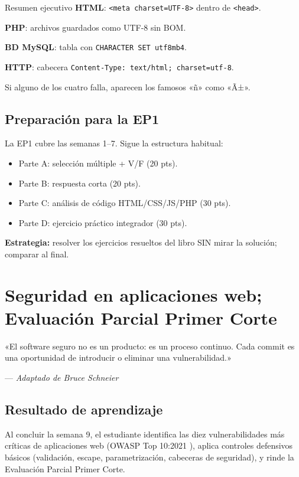 \documentclass[11pt,a4paper,openany]{book}
\begin{document}
\begin{cajadefinicion}{Resumen ejecutivo}
\textbf{HTML}: \texttt{<meta charset=UTF-8>} dentro de
\texttt{<head>}.

\textbf{PHP}: archivos guardados como UTF-8 sin BOM.

\textbf{BD MySQL}: tabla con \texttt{CHARACTER SET utf8mb4}.

\textbf{HTTP}: cabecera
\texttt{Content-Type: text/html; charset=utf-8}.

Si alguno de los cuatro falla, aparecen los famosos «ñ» como «Ã±».
\end{cajadefinicion}

\section{Preparación para la EP1}

La EP1 cubre las semanas 1--7. Sigue la estructura habitual:
\begin{itemize}
\item Parte A: selección múltiple + V/F (20 pts).
\item Parte B: respuesta corta (20 pts).
\item Parte C: análisis de código HTML/CSS/JS/PHP (30 pts).
\item Parte D: ejercicio práctico integrador (30 pts).
\end{itemize}

\textbf{Estrategia:} resolver los ejercicios resueltos del libro
SIN mirar la solución; comparar al final.


\chapter{Seguridad en aplicaciones web; Evaluación Parcial Primer Corte}
\label{cap:semana9}

\epigraph{«El software seguro no es un producto: es un proceso
continuo. Cada commit es una oportunidad de introducir o eliminar una
vulnerabilidad.»}{--- \textit{Adaptado de Bruce Schneier}}

\section*{Resultado de aprendizaje}
Al concluir la semana 9, el estudiante identifica las diez
vulnerabilidades más críticas de aplicaciones web (OWASP Top 10:2021
\cite{owasp2021top10}), aplica controles defensivos básicos
(validación, escape, parametrización, cabeceras de seguridad), y
rinde la Evaluación Parcial Primer Corte.
\end{document}
